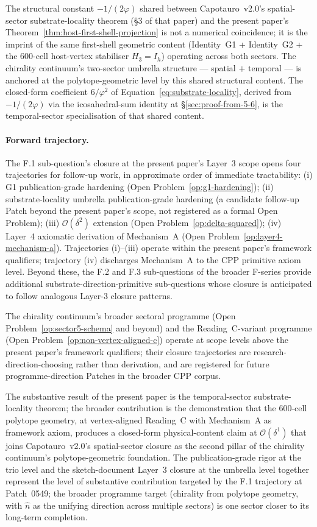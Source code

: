 \documentclass[11pt,letterpaper]{article}
\newcommand{\phig}{\varphi}
\newcommand{\bigO}[1]{\mathcal{O}(#1)}
\begin{document}
The structural constant $-1/(2\phig)$ shared between Capotauro~v2.0's spatial-sector substrate-locality theorem (\S3 of that paper) and the present paper's Theorem~\ref{thm:host-first-shell-projection} is not a numerical coincidence; it is the imprint of the same first-shell geometric content (Identity~G1 + Identity~G2 + the 600-cell host-vertex stabiliser $H_3 = I_h$) operating across both sectors. The chirality continuum's two-sector umbrella structure --- spatial $+$ temporal --- is anchored at the polytope-geometric level by this shared structural content. The closed-form coefficient $6/\phig^2$ of Equation~\eqref{eq:substrate-locality}, derived from $-1/(2\phig)$ via the icosahedral-sum identity at \S\ref{sec:proof-from-5-6}, is the temporal-sector specialisation of that shared content.

\paragraph{Forward trajectory.}
The F.1 sub-question's closure at the present paper's Layer~3 scope opens four trajectories for follow-up work, in approximate order of immediate tractability: (i) G1 publication-grade hardening (Open Problem~\ref{op:g1-hardening}); (ii) substrate-locality umbrella publication-grade hardening (a candidate follow-up Patch beyond the present paper's scope, not registered as a formal Open Problem); (iii) $\bigO{\delta^2}$ extension (Open Problem~\ref{op:delta-squared}); (iv) Layer~4 axiomatic derivation of Mechanism~A (Open Problem~\ref{op:layer4-mechanism-a}). Trajectories (i)--(iii) operate within the present paper's framework qualifiers; trajectory (iv) discharges Mechanism~A to the CPP primitive axiom level. Beyond these, the F.2 and F.3 sub-questions of the broader F-series provide additional substrate-direction-primitive sub-questions whose closure is anticipated to follow analogous Layer-3 closure patterns.

The chirality continuum's broader sectoral programme (Open Problem~\ref{op:sector5-schema} and beyond) and the Reading~C-variant programme (Open Problem~\ref{op:non-vertex-aligned-c}) operate at scope levels above the present paper's framework qualifiers; their closure trajectories are research-direction-choosing rather than derivation, and are registered for future programme-direction Patches in the broader CPP corpus.

The substantive result of the present paper is the temporal-sector substrate-locality theorem; the broader contribution is the demonstration that the 600-cell polytope geometry, at vertex-aligned Reading~C with Mechanism~A as framework axiom, produces a closed-form physical-content claim at $\bigO{\delta^1}$ that joins Capotauro~v2.0's spatial-sector closure as the second pillar of the chirality continuum's polytope-geometric foundation. The publication-grade rigor at the trio level and the sketch-document Layer~3 closure at the umbrella level together represent the level of substantive contribution targeted by the F.1 trajectory at Patch~0549; the broader programme target (chirality from polytope geometry, with $\hat{n}$ as the unifying direction across multiple sectors) is one sector closer to its long-term completion.
\end{document}
